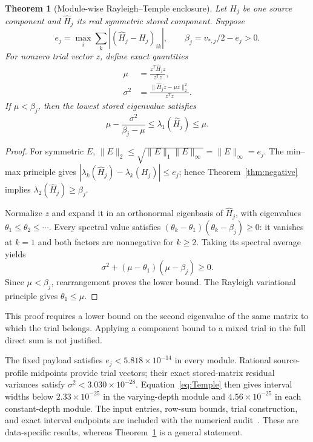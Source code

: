 \documentclass[journal,a4paper,10pt]{IEEEtran}
\newtheorem{theorem}{Theorem}
\theoremstyle{definition}\newtheorem{definition}[theorem]{Definition}
\theoremstyle{remark}\newtheorem{remark}[theorem]{Remark}
\newcommand{\norm}[1]{\lVert #1\rVert}
\begin{document}
\begin{theorem}[Module-wise Rayleigh--Temple enclosure]\label{thm:temple}
Let $H_j$ be one source component and $\widehat H_j$ its real symmetric stored component. Suppose
\begin{equation}
e_j=\max_i\sum_k|(\widehat H_j-H_j)_{ik}|,
\qquad \beta_j=v_{*,j}/2-e_j>0.
\end{equation}
For nonzero trial vector $z$, define exact quantities
\begin{align}
\mu&=\frac{z^T\widehat H_jz}{z^Tz},\label{eq:mu}\\
\sigma^2&=\frac{\norm{\widehat H_jz-\mu z}_2^2}{z^Tz}.\label{eq:var}
\end{align}
If $\mu<\beta_j$, then the lowest stored eigenvalue satisfies
\begin{equation}\label{eq:Temple}
\mu-\frac{\sigma^2}{\beta_j-\mu}
\leq\lambda_1(\widehat H_j)\leq\mu.
\end{equation}
\end{theorem}
\begin{proof}
For symmetric $E$, $\norm E_2\leq\sqrt{\norm E_1\norm E_\infty}=\norm E_\infty=e_j$. The min--max principle gives $|\lambda_k(\widehat H_j)-\lambda_k(H_j)|\leq e_j$; hence Theorem~\ref{thm:negative} implies $\lambda_2(\widehat H_j)\geq\beta_j$.

Normalize $z$ and expand it in an orthonormal eigenbasis of $\widehat H_j$, with eigenvalues $\theta_1\leq\theta_2\leq\cdots$. Every spectral value satisfies
$(\theta_k-\theta_1)(\theta_k-\beta_j)\geq0$: it vanishes at $k=1$ and both factors are nonnegative for $k\geq2$. Taking its spectral average yields
\begin{equation}
\sigma^2+(\mu-\theta_1)(\mu-\beta_j)\geq0.
\end{equation}
Since $\mu<\beta_j$, rearrangement proves the lower bound. The Rayleigh variational principle gives $\theta_1\leq\mu$.
\end{proof}
This proof requires a lower bound on the second eigenvalue of the same matrix to which the trial belongs. Applying a component bound to a mixed trial in the full direct sum is not justified.

The fixed payload satisfies $e_j<5.818\times10^{-14}$ in every module. Rational source-profile midpoints provide trial vectors; their exact stored-matrix residual variances satisfy $\sigma^2<3.030\times10^{-28}$. Equation~\eqref{eq:Temple} then gives interval widths below $2.33\times10^{-25}$ in the varying-depth module and $4.56\times10^{-25}$ in each constant-depth module. The input entries, row-sum bounds, trial construction, and exact interval endpoints are included with the numerical audit~\cite{audit}. These are data-specific results, whereas Theorem~\ref{thm:temple} is a general statement.
\end{document}

